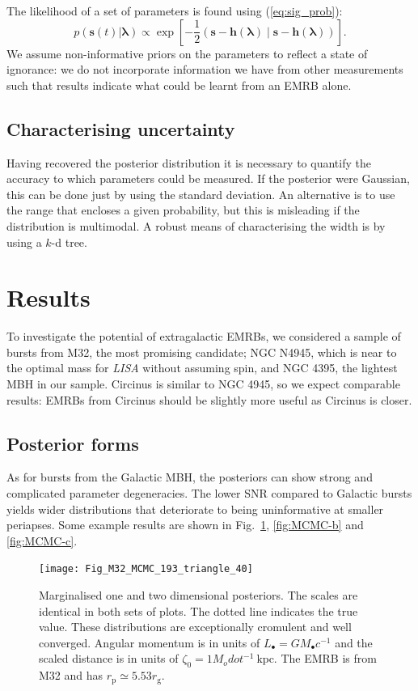 \documentclass[useAMS,usedcolumn,usegraphicx,usenatbib]{mn2e}
\newcommand{\eqnref}[1]{(\ref{eq:#1})}
\newcommand{\figref}[1]{Fig.~\ref{fig:#1}}
\newcommand{\units}[1]{\ensuremath{~\mathrm{#1}}}
\newcommand{\sub}[1]{\ensuremath{_\mathrm{#1}}}
\newcommand{\recip}[1]{\ensuremath{\frac{1}{#1}}}
\newcommand{\innerprod}[2]{\ensuremath{\left({#1}\middle|{#2}\right)}}
\begin{document}
The likelihood of a set of parameters is found using \eqnref{sig_prob}:
\begin{equation}
p(\boldsymbol{s}(t)|\boldsymbol{\lambda}) \propto \exp\left[-\recip{2}\innerprod{\boldsymbol{s}-\boldsymbol{h}(\boldsymbol{\lambda})}{\boldsymbol{s}-\boldsymbol{h}(\boldsymbol{\lambda})}\right].
\label{eq:likelihood}
\end{equation}
We assume non-informative priors on the parameters to reflect a state of ignorance: we do not incorporate information we have from other measurements such that results indicate what could be learnt from an EMRB alone.

\subsection{Characterising uncertainty}

Having recovered the posterior distribution it is necessary to quantify the accuracy to which parameters could be measured. If the posterior were Gaussian, this can be done just by using the standard deviation. An alternative is to use the range that encloses a given probability, but this is misleading if the distribution is multimodal. A robust means of characterising the width is by using a $k$-d tree.

\section{Results}\label{sec:Res}

To investigate the potential of extragalactic EMRBs, we considered a sample of bursts from M32, the most promising candidate; NGC N4945, which is near to the optimal mass for \textit{LISA} without assuming spin, and NGC 4395, the lightest MBH in our sample. Circinus is similar to NGC 4945, so we expect comparable results: EMRBs from Circinus should be slightly more useful as Circinus is closer.

\subsection{Posterior forms}

As for bursts from the Galactic MBH, the posteriors can show strong and complicated parameter degeneracies. The lower SNR compared to Galactic bursts yields wider distributions that deteriorate to being uninformative at smaller periapses. Some example results are shown in \figref{MCMC-a}, \ref{fig:MCMC-b} and \ref{fig:MCMC-c}.
\begin{figure}
\begin{center}
   \texttt{[image: Fig\_M32\_MCMC\_193\_triangle\_40]}
\caption{Marginalised one and two dimensional posteriors. The scales are identical in both sets of plots. The dotted line indicates the true value. These distributions are exceptionally cromulent and well converged. Angular momentum is in units of $L_\bullet = GM_\bullet c^{-1}$ and the scaled distance is in units of $\zeta_0 = 1 M_odot^{-1}\units{kpc}$. The EMRB is from M32 and has $r\sub{p} \simeq 5.53 r\sub{g}$.\label{fig:MCMC-a}}
\end{center}
\end{figure}
\end{document}
